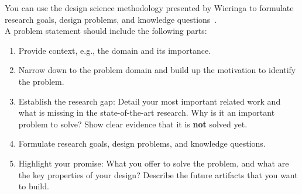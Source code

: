 \begin{tcolorbox}
	You can use the design science methodology presented by Wieringa to formulate research goals, design problems, and knowledge questions~\cite{wieringa2014design}.
	\\
	A problem statement should include the following parts:
	\begin{enumerate}
		\item Provide context, e.g., the domain and its importance.
		\item Narrow down to the problem domain and build up the motivation to identify the problem.
		\item Establish the research gap: Detail your most important related work and what is missing in the state-of-the-art research. Why is it an important problem to solve? Show clear evidence that it is \textbf{not} solved yet.
		\item Formulate research goals, design problems, and knowledge questions.
		\item Highlight your promise: What you offer to solve the problem, and what are the key properties of your design? Describe the future artifacts that you want to build.
	\end{enumerate}
\end{tcolorbox}


